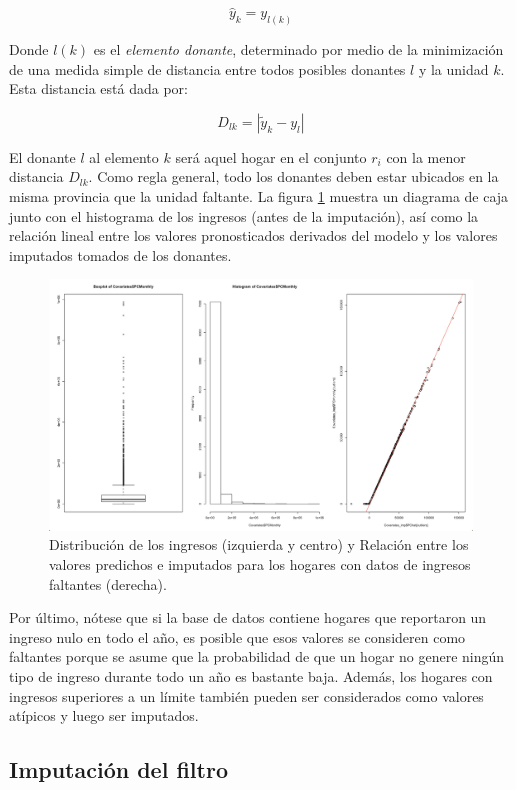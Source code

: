 \documentclass[
  12pt,
]{book}
\begin{document}
\[\hat{y}_k = y_{l(k)}\]

Donde \(l(k)\) es el \emph{elemento donante}, determinado por medio de la minimización de una medida simple de distancia entre todos posibles donantes \(l\) y la unidad \(k\). Esta distancia está dada por:

\[
D_{lk} = |\tilde y_k - y_l|
\]

El donante \(l\) al elemento \(k\) será aquel hogar en el conjunto \(r_i\) con la menor distancia \(D_{lk}\). Como regla general, todo los donantes deben estar ubicados en la misma provincia que la unidad faltante. La figura \ref{fig:fig10} muestra un diagrama de caja junto con el histograma de los ingresos (antes de la imputación), así como la relación lineal entre los valores pronosticados derivados del modelo y los valores imputados tomados de los donantes.

\begin{figure}
\includegraphics[width=0.5\linewidth]{Pics/10} \caption{Distribución de los ingresos (izquierda y centro) y Relación entre los valores predichos e imputados para los hogares con datos de ingresos faltantes (derecha).}\label{fig:fig10}
\end{figure}

Por último, nótese que si la base de datos contiene hogares que reportaron un ingreso nulo en todo el año, es posible que esos valores se consideren como faltantes porque se asume que la probabilidad de que un hogar no genere ningún tipo de ingreso durante todo un año es bastante baja. Además, los hogares con ingresos superiores a un límite también pueden ser considerados como valores atípicos y luego ser imputados.

\hypertarget{imputaciuxf3n-del-filtro}{%
\subsection{Imputación del filtro}\label{imputaciuxf3n-del-filtro}}
\end{document}
